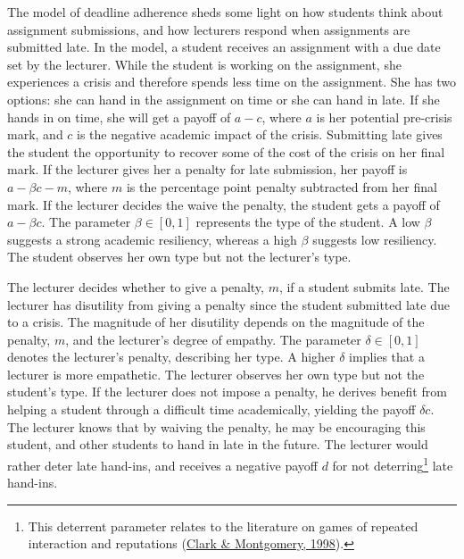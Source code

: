 \documentclass[11pt,preprint, authoryear]{elsarticle}
\numberwithin{equation}{section}
\numberwithin{figure}{section}
\numberwithin{table}{section}
\let\rmarkdownfootnote\footnote%
\def\footnote{\protect\rmarkdownfootnote}
\begin{document}
The model of deadline adherence sheds some light on how students think
about assignment submissions, and how lecturers respond when assignments
are submitted late. In the model, a student receives an assignment with
a due date set by the lecturer. While the student is working on the
assignment, she experiences a crisis and therefore spends less time on
the assignment. She has two options: she can hand in the assignment on
time or she can hand in late. If she hands in on time, she will get a
payoff of \(a-c\), where \(a\) is her potential pre-crisis mark, and
\(c\) is the negative academic impact of the crisis. Submitting late
gives the student the opportunity to recover some of the cost of the
crisis on her final mark. If the lecturer gives her a penalty for late
submission, her payoff is \(a-\beta c -m\), where \(m\) is the
percentage point penalty subtracted from her final mark. If the lecturer
decides the waive the penalty, the student gets a payoff of
\(a-\beta c\). The parameter \(\beta \in [0,1]\) represents the type of
the student. A low \(\beta\) suggests a strong academic resiliency,
whereas a high \(\beta\) suggests low resiliency. The student observes
her own type but not the lecturer's type.

The lecturer decides whether to give a penalty, \(m\), if a student
submits late. The lecturer has disutility from giving a penalty since
the student submitted late due to a crisis. The magnitude of her
disutility depends on the magnitude of the penalty, \(m\), and the
lecturer's degree of empathy. The parameter \(\delta \in [0,1]\) denotes
the lecturer's penalty, describing her type. A higher \(\delta\) implies
that a lecturer is more empathetic. The lecturer observes her own type
but not the student's type. If the lecturer does not impose a penalty,
he derives benefit from helping a student through a difficult time
academically, yielding the payoff \(\delta c\). The lecturer knows that
by waiving the penalty, he may be encouraging this student, and other
students to hand in late in the future. The lecturer would rather deter
late hand-ins, and receives a negative payoff \(d\) for not
deterring\footnote{This deterrent parameter relates to the literature on
  games of repeated interaction and reputations
  (\protect\hyperlink{ref-deter}{Clark \& Montgomery, 1998}).} late
hand-ins.
\end{document}
